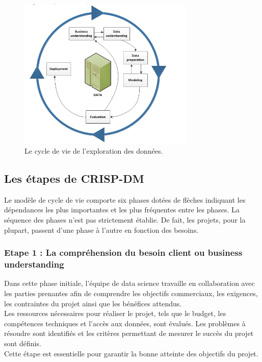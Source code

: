 \documentclass[a4paper,12pt]{report}
\begin{document}
        \begin{figure}[h]
                \centering
                \includegraphics[width=0.75\textwidth]{crispdm}
                \caption{Le cycle de vie de l'exploration des données.}
                \label{fig:mesh1}
        \end{figure} 

        \subsection{Les étapes de CRISP-DM}
        Le modèle de cycle de vie comporte six phases dotées de flèches indiquant les dépendances les plus importantes et les plus fréquentes entre les phases. La séquence des phases n'est pas strictement établie. De fait, les projets, pour la plupart, passent d'une phase à l'autre en fonction des besoins. 

            \subsubsection{Etape 1 : La compréhension du besoin client ou business understanding}
            Dans cette phase initiale, l’équipe de data science travaille en collaboration avec les parties prenantes afin de comprendre les objectifs commerciaux, les exigences, les contraintes du projet ainsi que les bénéfices attendus.\\ 
            Les ressources nécessaires pour réaliser le projet, tels que le budget, les compétences techniques et l'accès aux données, sont évalués. Les problèmes à résoudre sont identifiés et les critères permettant de mesurer le succès du projet sont définis. \\
            Cette étape est essentielle pour garantir la bonne atteinte des objectifs du projet.
    
\end{document}

